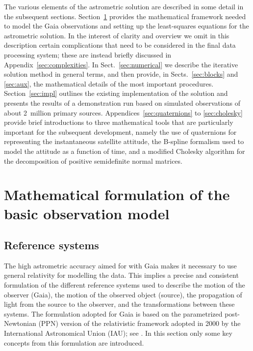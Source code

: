 \documentclass[structabstract]{aa}
\begin{document}
The various elements of the astrometric solution are described in some
detail in the subsequent sections. 
Section~\ref{sec:math} provides the mathematical framework needed to model 
the Gaia observations and setting up the least-squares equations for the 
astrometric solution. In the interest of clarity and overview we omit in this 
description certain complications that need to be considered in the final 
data processing system; these are instead briefly discussed in 
Appendix~\ref{sec:complexities}. In Sect.~\ref{sec:numerical} we describe the 
iterative solution method in general terms, and then provide, in 
Sects.~\ref{sec:blocks} and \ref{sec:aux}, the mathematical details of the 
most important procedures. Section~\ref{sec:impl} outlines the existing 
implementation of the solution and presents the results of a 
demonstration run based on simulated observations of about 
2~million primary sources. Appendices~\ref{sec:quaternions} to 
\ref{sec:cholesky} provide brief introductions to three mathematical 
tools that are particularly important for the subsequent development,
namely the use of quaternions for representing the instantaneous satellite 
attitude, the B-spline formalism used to model the attitude as a function of
time, and a modified Cholesky algorithm for the decomposition of positive 
semidefinite normal matrices.


\section{Mathematical formulation of the basic observation model}\label{sec:math}

\subsection{Reference systems}\label{sec:refsystems}

The high astrometric accuracy aimed for with Gaia makes
it necessary to use general relativity for modelling the data. This
implies a precise and consistent formulation of the different reference
systems used to describe the motion of the observer (Gaia), the motion
of the observed object (source), the propagation of light from the source
to the observer, and the transformations between these systems. The
formulation adopted for Gaia \citep{klioner2003,klioner2004} is based
on the parametrized post-Newtonian (PPN) version of the relativistic
framework adopted in 2000 by the International Astronomical Union (IAU);
see \citet{soffel+2003}. In this section only some key concepts from this
formulation are introduced.
\end{document}

